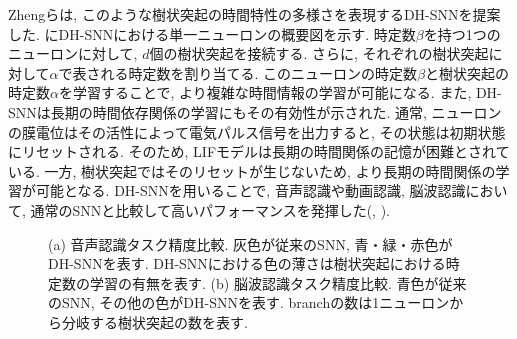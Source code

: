 Zhengらは, このような樹状突起の時間特性の多様さを表現するDH-SNNを提案した.
にDH-SNNにおける単一ニューロンの概要図を示す.
時定数$\beta$を持つ1つのニューロンに対して, $d$個の樹状突起を接続する.
さらに, それぞれの樹状突起に対して$\alpha$で表される時定数を割り当てる.
このニューロンの時定数$\beta$と樹状突起の時定数$\alpha$を学習することで, より複雑な時間情報の学習が可能になる.
また, DH-SNNは長期の時間依存関係の学習にもその有効性が示された.
通常, ニューロンの膜電位はその活性によって電気パルス信号を出力すると, その状態は初期状態にリセットされる.
そのため, LIFモデルは長期の時間関係の記憶が困難とされている.
一方, 樹状突起ではそのリセットが生じないため, より長期の時間関係の学習が可能となる.
DH-SNNを用いることで, 音声認識や動画認識, 脳波認識において, 通常のSNNと比較して高いパフォーマンスを発揮した(, ).
\begin{figure}
    \centering

    \parbox{1.0\textwidth}{
        \centering

        \begin{minipage}{0.5336\textwidth}
            
            \label{fig:dhsnn:voice}
        \end{minipage}
        \hspace{0.02\textwidth}
        \begin{minipage}{0.3663\textwidth}
            
            \label{fig:dhsnn:brain}
        \end{minipage}

        \caption[DH-SNNにおける精度比較]{
            \cite{dhsnn}
            (a) 音声認識タスク精度比較.
            灰色が従来のSNN, 青・緑・赤色がDH-SNNを表す.
            DH-SNNにおける色の薄さは樹状突起における時定数の学習の有無を表す.
            (b) 脳波認識タスク精度比較.
            青色が従来のSNN, その他の色がDH-SNNを表す.
            branchの数は1ニューロンから分岐する樹状突起の数を表す.
        }
    }
\end{figure}
